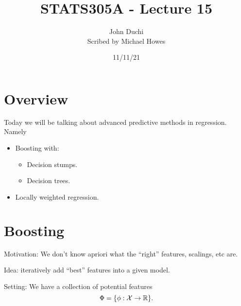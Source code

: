 

\DeclareMathOperator{\sgn}{sign}


\title{STATS305A - Lecture 15}
\author{John Duchi\\ Scribed by Michael Howes}
\date{11/11/21}

\pagestyle{fancy}
\fancyhf{}


\maketitle
\tableofcontents
\section{Overview}
Today we will be talking about advanced predictive methods in regression. Namely
\begin{itemize}
    \item Boosting with: \begin{itemize}
        \item Decision stumps.
        \item Decision trees.
    \end{itemize}
    \item Locally weighted regression.
\end{itemize}
\section{Boosting}
Motivation: We don't know apriori what the ``right'' features, scalings, etc are. 

Idea: iteratively add ``best'' features into a given model.

Setting: We have a collection of potential features
\[\Phi = \{ \phi : {\mathcal{X}} \to {\mathbb R}\}.\]
